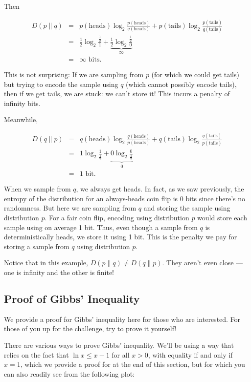 \documentclass[6008notes.tex]{subfiles}
\begin{document}
Then

\begin{eqnarray*}
D(p \parallel q)
&=&
  p(\text{heads}) \log_2 \frac{p(\text{heads})}{q(\text{heads})}
+ p(\text{tails}) \log_2 \frac{p(\text{tails})}{q(\text{tails})} \\
&=&
  \frac12\log_2 \frac{\frac12}1
+ \underbrace{\frac12\log_2 \frac{\frac12}0}_{\infty} \\
&=&
  \infty\text{ bits}.
\end{eqnarray*}

This is not surprising: If we are sampling from $p$ (for which we could get tails) but trying to encode the sample using $q$ (which cannot possibly encode tails), then if we get tails, we are stuck: we can't store it! This incurs a penalty of infinity bits.

Meanwhile,

\begin{eqnarray*}
D(q \parallel p)
&=&
  q(\text{heads}) \log_2 \frac{q(\text{heads})}{p(\text{heads})}
+ q(\text{tails}) \log_2 \frac{q(\text{tails})}{p(\text{tails})} \\
&=&
  1 \log_2 \frac1{\frac12}
+ \underbrace{0 \log_2 \frac0{\frac12}}_0 \\
&=&
  1\text{ bit}.
\end{eqnarray*}

When we sample from $q$, we always get heads. In fact, as we saw previously, the entropy of the distribution for an always-heads coin flip is 0 bits since there's no randomness. But here we are sampling from $q$ and storing the sample using distribution $p$. For a fair coin flip, encoding using distribution $p$ would store each sample using on average 1 bit. Thus, even though a sample from $q$ is deterministically heads, we store it using 1 bit. This is the penalty we pay for storing a sample from $q$ using distribution $p$.

Notice that in this example, $D(p \parallel q) \ne D(q \parallel p)$. They aren't even close --- one is infinity and the other is finite!

\subsection{Proof of Gibbs' Inequality}

We provide a proof for Gibbs' inequality here for those who are interested. For those of you up for the challenge, try to prove it yourself!

There are various ways to prove Gibbs' inequality. We'll be using a way that relies on the fact that $\ln x\le x-1$ for all $x>0$, with equality if and only if $x=1$, which we provide a proof for at the end of this section, but for which you can also readily see from the following plot:
\end{document}
